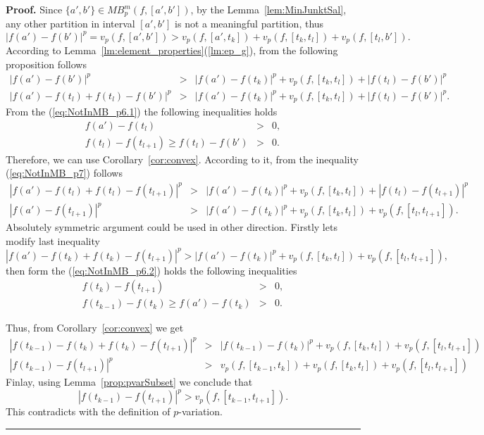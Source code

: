 \documentclass[12pt, a4paper]{article}
\newenvironment{proof}[1][Proof]{\noindent \textbf{#1.} }{\  \rule{0.5em}{0.5em}}
\numberwithin{equation}{section}
\begin{document}
\begin{proof}
  Since $\{a',b'\} \in MB_p^m(f,[a',b'])$, by the Lemma~\ref{lem:MinJunktSal},
  any other partition in interval $[a',b']$ 
  is not a meaningful partition, thus 
  \begin{equation}
  |f(a')-f(b')|^p = v_p(f,[a',b']) > v_p(f,[a',t_{k}]) + v_p(f,[t_{k},t_{l}]) + v_p(f,[t_{l},b']). 
  \end{equation}
  According to Lemma~\ref{lm:element_properties}(\ref{lm:ep_g}), from the following proposition follows
  \begin{eqnarray*} 
    |f(a')-f(b')|^p &>& |f(a')-f(t_{k})|^p + v_p(f,[t_k,t_l]) +  |f(t_{l})-f(b')|^p \\
    |f(a')-f(t_l)+f(t_l)-f(b')|^p &>& |f(a')-f(t_{k})|^p + v_p(f,[t_k,t_l]) +  |f(t_{l})-f(b')|^p.  \label{eq:NotInMB_p7} 
  \end{eqnarray*}
  From the (\ref{eq:NotInMB_p6.1}) the following inequalities holds
  \begin{eqnarray*}
    f(a')-f(t_l) &>& 0, \\
    f(t_{l})-f(t_{l+1}) \geq f(t_l)-f(b') &>& 0.
  \end{eqnarray*} 
  Therefore, we can use Corollary~\ref{cor:convex}. According to it,
  from the inequality (\ref{eq:NotInMB_p7}) follows  
  \begin{eqnarray*}
    |f(a')-f(t_l)+f(t_l)-f(t_{l+1})|^p &>& |f(a')-f(t_{k})|^p + v_p(f,[t_k,t_l]) +  |f(t_{l})-f(t_{l+1})|^p \\
    |f(a')-f(t_{l+1})|^p &>& |f(a')-f(t_{k})|^p + v_p(f,[t_k,t_l]) +  v_p(f,[t_l,t_{l+1}]). 
  \end{eqnarray*} 
  Absolutely symmetric argument could be used in other direction. Firstly lets modify last inequality
  $$  |f(a')-f(t_k)+f(t_k)-f(t_{l+1})|^p > |f(a')-f(t_{k})|^p + v_p(f,[t_k,t_l]) +  v_p(f,[t_l,t_{l+1}]), $$
  then form the  (\ref{eq:NotInMB_p6.2}) holds the following inequalities
  \begin{eqnarray*}
    f(t_k)-f(t_{l+1}) &>& 0, \\
    f(t_{k-1})-f(t_{k}) \geq f(a')-f(t_k) &>& 0.
  \end{eqnarray*} 

  Thus, from Corollary~\ref{cor:convex} we get
  \begin{eqnarray*}
    |f(t_{k-1})-f(t_k)+f(t_k)-f(t_{l+1})|^p&>&|f(t_{k-1})-f(t_{k})|^p+v_p(f,[t_k,t_l])+v_p(f,[t_l,t_{l+1}]) \\
    |f(t_{k-1})-f(t_{l+1})|^p &>& v_p(f,[t_{k-1},t_{k}]) + v_p(f,[t_k,t_l])+v_p(f,[t_l,t_{l+1}])
  \end{eqnarray*}  
  Finlay, using Lemma~\ref{prop:pvarSubset} we conclude that
  $$|f(t_{k-1})-f(t_{l+1})|^p > v_p(f,[t_{k-1},t_{l+1}]).$$
  This contradicts with the definition of $p$-variation.  
\end{proof}
\end{document}
